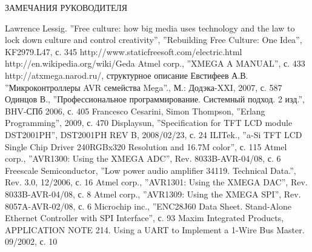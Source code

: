 \documentclass[russian,utf8,14pt,emptystyle,pointsubsection,reduceheight=0mm]{eskdtext}
\begin{document}
\pagestyle{plain}
\thispagestyle{empty}

\newpage{}

\begin{center}
\MakeUppercase{ЗАМЕЧАНИЯ РУКОВОДИТЕЛЯ}
\end{center}
\newpage{}


\newpage{}

\setcounter{page}{3}
\tableofcontents
\newpage{}

%














\begin{thebibliography}{99}
 Lawrence Lessig. ''Free culture: how big media uses technology and the law to lock down culture and control creativity'', ''Rebuilding Free Culture: One Idea'', KF2979.L47, с. 345
 http://www.staticfreesoft.com/electric.html
 http://en.wikipedia.org/wiki/Geda
 Atmel corp., ''XMEGA A MANUAL'', с. 433
 http://atxmega.narod.ru/, структурное описание
 Евстифеев А.В. ''Микроконтроллеры AVR семейства Mega''., М.: Додэка-XXI, 2007, с. 587
 Одинцов В., ''Профессиональное программирование. Системный подход. 2 изд.'', BHV-СПб 2006, с. 405
 Francesco Cesarini, Simon Thompson, ''Erlang Programming'', 2009, с. 470
 Displaysun, ''Specification for TFT LCD module DST2001PH'', DST2001PH REV B, 2008/02/23, с. 24
 ILITek., ''a-Si TFT LCD Single Chip Driver 240RGBx320 Resolution and 16.7M color'', с. 115
 Atmel corp., ''AVR1300: Using the XMEGA ADC'', Rev. 8033B-AVR-04/08, с. 6
 Freescale Semiconductor, ''Low power audio amplifier 34119. Technical Data.'', Rev. 3.0, 12/2006, с. 16
 Atmel corp., ''AVR1301: Using the XMEGA DAC'', Rev. 8033B-AVR-04/08, с. 8
 Atmel corp., ''AVR1309: Using the XMEGA SPI'', Rev. 8057A-AVR-02/08, с. 6
 Microchip inc., ''ENC28J60 Data Sheet. Stand-Alone Ethernet Controller with SPI Interface'', с. 93
 Maxim Integrated Products, APPLICATION NOTE 214. Using a UART to Implement a 1-Wire Bus Master. 09/2002, с. 10
\end{thebibliography}


\end{document}
